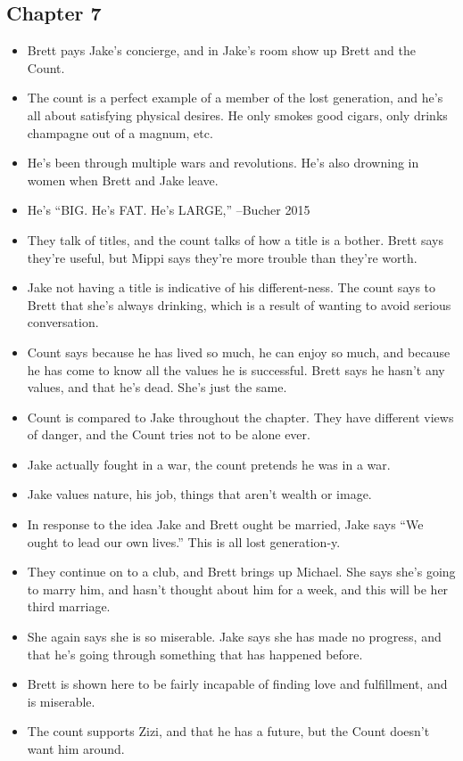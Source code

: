 \documentclass[11pt]{article}
\begin{document}
\subsection{Chapter 7}
\begin{itemize}
	\item Brett pays Jake's concierge, and in Jake's room show up Brett and 
		the Count.
	\item The count is a perfect example of a member of the lost generation, 
		and he's all about satisfying physical desires.  He only smokes good 
		cigars, only drinks champagne out of a magnum, etc.
	\item He's been through multiple wars and revolutions.  He's also drowning 
		in women when Brett and Jake leave.
	\item He's ``BIG.  He's FAT.  He's LARGE,'' --Bucher 2015
	\item They talk of titles, and the count talks of how a title is a bother.  
		Brett says they're useful, but Mippi says they're more trouble than 
		they're worth.
	\item Jake not having a title is indicative of his different-ness.  The 
		count says to Brett that she's always drinking, which is a result of 
		wanting to avoid serious conversation.
	\item Count says because he has lived so much, he can enjoy so much, and 
		because he has come to know all the values he is successful.  Brett 
		says he hasn't any values, and that he's dead.  She's just the same.
	\item Count is compared to Jake throughout the chapter.  They have 
		different views of danger, and the Count tries not to be alone ever.
	\item Jake actually fought in a war, the count pretends he was in a war.
	\item Jake values nature, his job, things that aren't wealth or image.
	\item In response to the idea Jake and  Brett ought be married, Jake says 
		``We ought to lead our own lives.''  This is all lost generation-y.
	\item They continue on to a club, and Brett brings up Michael.  She says 
		she's going to marry him, and hasn't thought about him for a week, and 
		this will be her third marriage.
	\item She again says she is so miserable.  Jake says she has made no 
		progress, and that he's going through something that has happened 
		before.
	\item Brett is shown here to be fairly incapable of finding love and 
		fulfillment, and is miserable.
	\item The count supports Zizi, and that he has a future, but the Count 
		doesn't want him around.
	\end{itemize}
\end{document}
